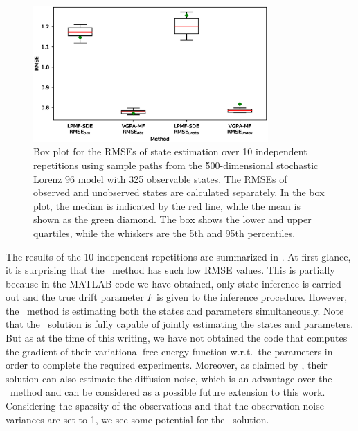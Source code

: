 \begin{figure}
    \centering
    \includegraphics[width=0.8\textwidth]{graphics/lorenz-96-states-boxplot}    
    \caption{Box plot for the RMSEs of state estimation over 10 independent repetitions using sample paths from the 500-dimensional stochastic Lorenz 96 model with 325 observable states. The RMSEs of observed and unobserved states are calculated separately. In the box plot, the median is indicated by the red line, while the mean is shown as the green diamond. The box shows the lower and upper quartiles, while the whiskers are the 5th and 95th percentiles.}
    \label{fig-lorenz-96-state-boxplot}
\end{figure}

The results of the 10 independent repetitions are summarized in .
At first glance, it is surprising that the \algovgpamf\ method has such low RMSE values.
This is partially because in the MATLAB code we have obtained, only state inference is carried out and the true drift parameter $F$ is given to the inference procedure.
However, the \algolpmfsde\ method is estimating both the states and parameters simultaneously.
Note that the \algovgpamf\ solution is fully capable of jointly estimating the states and parameters.
But as at the time of this writing, we have not obtained the code that computes the gradient of their variational free energy function w.r.t.\ the parameters in order to complete the required experiments.
Moreover, as claimed by \cite{vrettas2015variational}, their  solution can also estimate the diffusion noise, which is an advantage over the \algolpmfsde\ method and can be considered as a possible future extension to this work.
Considering the sparsity of the observations and that the observation noise variances are set to 1, we see some potential for the \algolpmfsde\ solution.

